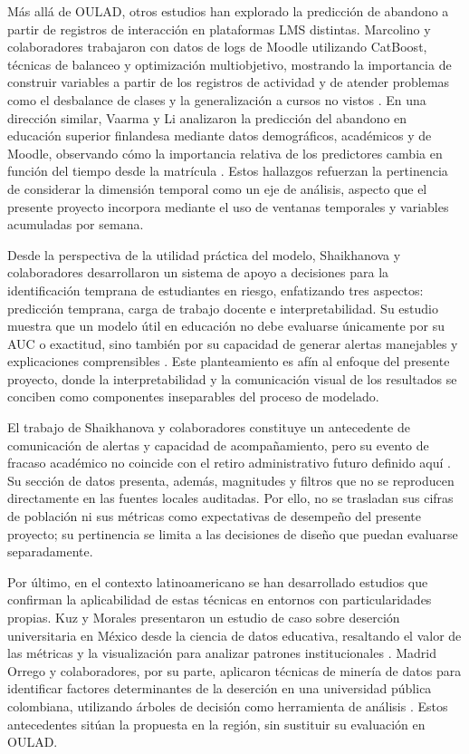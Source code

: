 Más allá de OULAD, otros estudios han explorado la predicción de abandono a partir de registros de interacción en plataformas LMS distintas. Marcolino y colaboradores trabajaron con datos de logs de Moodle utilizando CatBoost, técnicas de balanceo y optimización multiobjetivo, mostrando la importancia de construir variables a partir de los registros de actividad y de atender problemas como el desbalance de clases y la generalización a cursos no vistos \cite{s41598025939181}. En una dirección similar, Vaarma y Li analizaron la predicción del abandono en educación superior finlandesa mediante datos demográficos, académicos y de Moodle, observando cómo la importancia relativa de los predictores cambia en función del tiempo desde la matrícula \cite{jtechsoc2024102474}. Estos hallazgos refuerzan la pertinencia de considerar la dimensión temporal como un eje de análisis, aspecto que el presente proyecto incorpora mediante el uso de ventanas temporales y variables acumuladas por semana.

Desde la perspectiva de la utilidad práctica del modelo, Shaikhanova y colaboradores desarrollaron un sistema de apoyo a decisiones para la identificación temprana de estudiantes en riesgo, enfatizando tres aspectos: predicción temprana, carga de trabajo docente e interpretabilidad. Su estudio muestra que un modelo útil en educación no debe evaluarse únicamente por su AUC o exactitud, sino también por su capacidad de generar alertas manejables y explicaciones comprensibles \cite{bdcc9110297}. Este planteamiento es afín al enfoque del presente proyecto, donde la interpretabilidad y la comunicación visual de los resultados se conciben como componentes inseparables del proceso de modelado.

El trabajo de Shaikhanova y colaboradores constituye un antecedente de comunicación de alertas y capacidad de acompañamiento, pero su evento de fracaso académico no coincide con el retiro administrativo futuro definido aquí \cite{bdcc9110297}. Su sección de datos presenta, además, magnitudes y filtros que no se reproducen directamente en las fuentes locales auditadas. Por ello, no se trasladan sus cifras de población ni sus métricas como expectativas de desempeño del presente proyecto; su pertinencia se limita a las decisiones de diseño que puedan evaluarse separadamente.

Por último, en el contexto latinoamericano se han desarrollado estudios que confirman la aplicabilidad de estas técnicas en entornos con particularidades propias. Kuz y Morales presentaron un estudio de caso sobre deserción universitaria en México desde la ciencia de datos educativa, resaltando el valor de las métricas y la visualización para analizar patrones institucionales \cite{eks30080}. Madrid Orrego y colaboradores, por su parte, aplicaron técnicas de minería de datos para identificar factores determinantes de la deserción en una universidad pública colombiana, utilizando árboles de decisión como herramienta de análisis \cite{latamv4i2697}. Estos antecedentes sitúan la propuesta en la región, sin sustituir su evaluación en OULAD.

